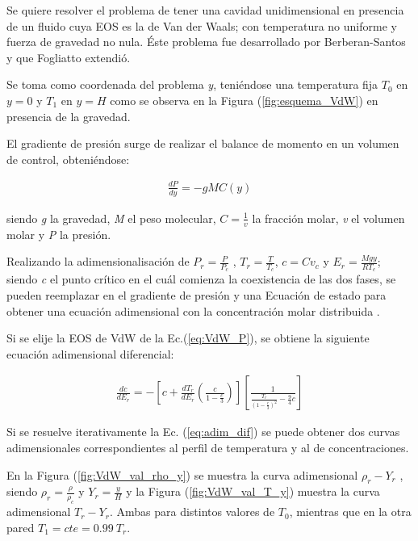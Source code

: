 Se quiere resolver el problema de tener una cavidad unidimensional en presencia de un fluido cuya EOS es la de Van der Waals; con temperatura  no uniforme y fuerza de gravedad no nula. Éste problema fue desarrollado por Berberan-Santos \cite{berberan2002liquid} y que Fogliatto \cite{fogliatto2019simulation} extendió. 

Se toma como coordenada del problema \textit{y}, teniéndose una temperatura fija $T_{0}$ en $y = 0$ y $T_{1}$ en $y = H$ como se observa en la Figura (\ref{fig:esquema_VdW}) en presencia de la gravedad.

El gradiente de presión surge de realizar el balance de momento en un volumen de control, obteniéndose:

\begin{align}
	\frac{d P}{d y} = - g M C(y)
\end{align}

siendo \textit{g} la gravedad, \textit{M} el peso molecular, $C = \frac{1}{v}$ la fracción molar, \textit{v} el volumen molar y \textit{P} la presión.

Realizando la adimensionalisación de $ P_r = \frac{P}{P_c}$ , $ T_r = \frac{T}{T_c}$, $c = C v_c$ y $E_r = \frac{M g y}{R T_c}$; siendo \textit{c} el punto crítico en el cuál comienza la coexistencia de las dos fases, se pueden reemplazar en el gradiente de presión y una Ecuación de estado para obtener una ecuación adimensional con la concentración molar distribuida \cite{fogliatto2019simulation}.



Si se elije la EOS de VdW de la Ec.(\ref{eq:VdW_P}), se obtiene la siguiente ecuación adimensional diferencial:

\begin{align}
	\frac{d c}{d E_r} = - \left[ c + \frac{d T_r}{d E_r} \left( \frac{c}{1 - \frac{c}{3}}\right) \right] \left[	\frac{1}{\frac{T_r}{{\left(1- \frac{c}{3}\right)}^2} - \frac{9}{4} c}  \right] 
	\label{eq:adim_dif}
\end{align} 

Si se resuelve iterativamente la Ec. (\ref{eq:adim_dif}) se puede obtener dos curvas adimensionales correspondientes al perfil de temperatura y al de concentraciones.

En la Figura (\ref{fig:VdW_val_rho_y}) se muestra la curva adimensional $ \rho_r - Y_r $ , siendo $\rho_r = \frac{\rho}{\rho_c}$ y  $Y_r = \frac{y}{H}$  y la Figura (\ref{fig:VdW_val_T_y}) muestra la curva adimensional $ T_r - Y_r $. Ambas para distintos valores de $T_0$, mientras que en la otra pared $T_1 = cte = 0.99 \> T_r$.

